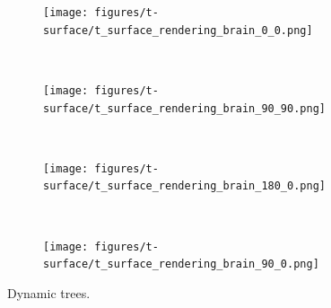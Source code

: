 \documentclass{article}
\begin{document}
\begin{figure}[H]
    \centering
    \begin{subfigure}[b]{0.45\textwidth}
        \texttt{[image: figures/t-surface/t\_surface\_rendering\_brain\_0\_0.png]}
    \end{subfigure}
    ~
    \begin{subfigure}[b]{0.45\textwidth}
        \texttt{[image: figures/t-surface/t\_surface\_rendering\_brain\_90\_90.png]}
    \end{subfigure}
    \\
    \begin{subfigure}[b]{0.45\textwidth}
        \texttt{[image: figures/t-surface/t\_surface\_rendering\_brain\_180\_0.png]}
    \end{subfigure}
    ~
    \begin{subfigure}[b]{0.45\textwidth}
        \texttt{[image: figures/t-surface/t\_surface\_rendering\_brain\_90\_0.png]}
    \end{subfigure}

    \caption{Dynamic trees.}
    \label{fig:t-surface}
\end{figure}
\end{document}
